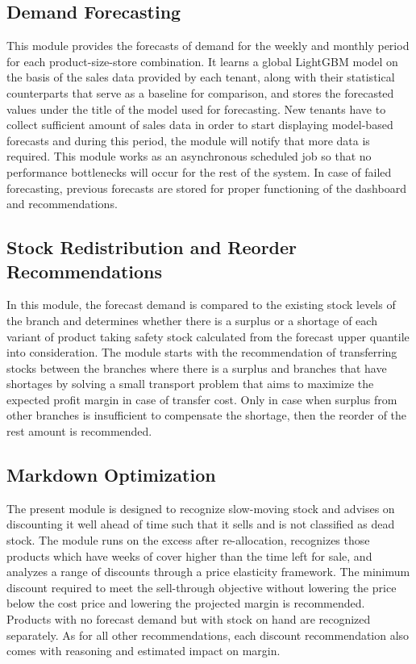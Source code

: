 \documentclass{StockSense}
\begin{document}
\subsection{Demand Forecasting}

This module provides the forecasts of demand for the weekly and monthly period for each product-size-store combination. It learns a global LightGBM model on the basis of the sales data provided by each tenant, along with their statistical counterparts that serve as a baseline for comparison, and stores the forecasted values under the title of the model used for forecasting. New tenants have to collect sufficient amount of sales data in order to start displaying model-based forecasts and during this period, the module will notify that more data is required. This module works as an asynchronous scheduled job so that no performance bottlenecks will occur for the rest of the system. In case of failed forecasting, previous forecasts are stored for proper functioning of the dashboard and recommendations.

\subsection{Stock Redistribution and Reorder Recommendations}

In this module, the forecast demand is compared to the existing stock levels of the branch and determines whether there is a surplus or a shortage of each variant of product taking safety stock calculated from the forecast upper quantile into consideration. The module starts with the recommendation of transferring stocks between the branches where there is a surplus and branches that have shortages by solving a small transport problem that aims to maximize the expected profit margin in case of transfer cost. Only in case when surplus from other branches is insufficient to compensate the shortage, then the reorder of the rest amount is recommended.

\subsection{Markdown Optimization}

The present module is designed to recognize slow-moving stock and advises on discounting it well ahead of time such that it sells and is not classified as dead stock. The module runs on the excess after re-allocation, recognizes those products which have weeks of cover higher than the time left for sale, and analyzes a range of discounts through a price elasticity framework. The minimum discount required to meet the sell-through objective without lowering the price below the cost price and lowering the projected margin is recommended. Products with no forecast demand but with stock on hand are recognized separately. As for all other recommendations, each discount recommendation also comes with reasoning and estimated impact on margin.
\end{document}

